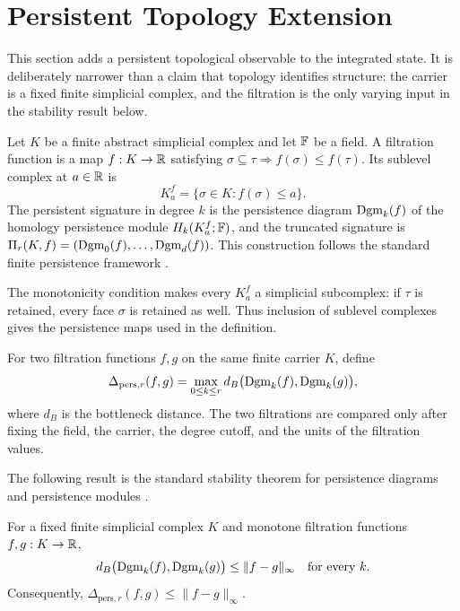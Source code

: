 \section{Persistent Topology Extension}

This section adds a persistent topological observable to the integrated state.
It is deliberately narrower than a claim that topology identifies structure:
the carrier is a fixed finite simplicial complex, and the filtration is the
only varying input in the stability result below.

\begin{definition}
Let $K$ be a finite abstract simplicial complex and let $\mathbb{F}$ be a field. A
filtration function is a map $f:K\to\mathbb{R}$ satisfying $\sigma\subseteq\tau
\Rightarrow f(\sigma)\leq f(\tau)$. Its sublevel complex at $a\in\mathbb{R}$ is
\[
 K_a^f=\{\sigma\in K:f(\sigma)\leq a\}.
\]
The persistent signature in degree $k$ is the persistence diagram
$\operatorname{Dgm}_k(f)$ of the homology persistence module
$H_k(K_a^f;\mathbb{F})$, and the truncated signature is
$\Pi_r(K,f)=(\operatorname{Dgm}_0(f),\ldots,\operatorname{Dgm}_d(f))$. This construction follows the
standard finite persistence framework
\cite{edelsbrunner2002topological,zomorodian2005computing}.
\end{definition}

The monotonicity condition makes every $K_a^f$ a simplicial subcomplex: if
$\tau$ is retained, every face $\sigma$ is retained as well. Thus inclusion
of sublevel complexes gives the persistence maps used in the definition.

\begin{definition}
For two filtration functions $f,g$ on the same finite carrier $K$, define
\[
 \Delta_{\mathrm{pers},r}(f,g)=\max_{0\leq k\leq r}
 d_B\bigl(\operatorname{Dgm}_k(f),\operatorname{Dgm}_k(g)\bigr),
\]
where $d_B$ is the bottleneck distance. The two filtrations are compared only
after fixing the field, the carrier, the degree cutoff, and the units of the
filtration values.
\end{definition}

The following result is the standard stability theorem for persistence
diagrams and persistence modules
\cite{cohensteiner2007stability,chazal2009proximity}.

\begin{theorem}
For a fixed finite simplicial complex $K$ and monotone filtration functions
$f,g:K\to\mathbb{R}$,
\[
 d_B\bigl(\operatorname{Dgm}_k(f),\operatorname{Dgm}_k(g)\bigr)\leq \|f-g\|_\infty
 \quad\text{for every }k.
\]
Consequently, $\Delta_{\mathrm{pers},r}(f,g)\leq\|f-g\|_\infty$.
\end{theorem}

